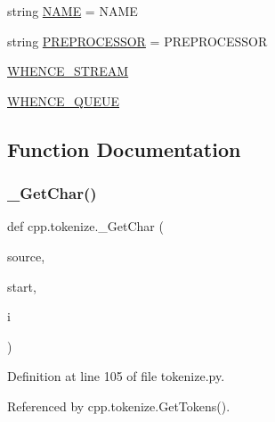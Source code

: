 \begin{DoxyCompactItemize}
\item 
string \hyperlink{namespacecpp_1_1tokenize_aa14251ded979d72f93d7b234d8cfb584}{N\+A\+ME} = \textquotesingle{}N\+A\+ME\textquotesingle{}
\item 
string \hyperlink{namespacecpp_1_1tokenize_a3c8918ee13b9acf5ea4e70b484d67268}{P\+R\+E\+P\+R\+O\+C\+E\+S\+S\+OR} = \textquotesingle{}P\+R\+E\+P\+R\+O\+C\+E\+S\+S\+OR\textquotesingle{}
\item 
\hyperlink{namespacecpp_1_1tokenize_a8dd117207e391864f7d9cb656e826a9e}{W\+H\+E\+N\+C\+E\+\_\+\+S\+T\+R\+E\+AM}
\item 
\hyperlink{namespacecpp_1_1tokenize_ad02466a473c5e9c2ac256e18209f0967}{W\+H\+E\+N\+C\+E\+\_\+\+Q\+U\+E\+UE}
\end{DoxyCompactItemize}


\subsection{Function Documentation}
\mbox{\label{namespacecpp_1_1tokenize_abeb75f493bd3035922daf150f5213ba9}} 
\subsubsection{\texorpdfstring{\+\_\+\+Get\+Char()}{\_GetChar()}}
{\footnotesize\ttfamily def cpp.\+tokenize.\+\_\+\+Get\+Char (\begin{DoxyParamCaption}\item[{}]{source,  }\item[{}]{start,  }\item[{}]{i }\end{DoxyParamCaption})\hspace{0.3cm}{\ttfamily [private]}}



Definition at line 105 of file tokenize.\+py.



Referenced by cpp.\+tokenize.\+Get\+Tokens().


